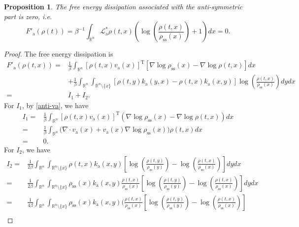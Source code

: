 \documentclass[10pt]{article}
\newtheorem{prop}[thm]{Proposition}
\theoremstyle{definition}
\numberwithin{equation}{section}
\begin{document}
\begin{prop}\label{prop:La}
The free energy dissipation associated with the anti-symmetric part is zero, i.e.
\begin{equation}\label{eq:Fadiss}
    F'_\mathrm{a}(\rho(t)) = \beta^{-1}\int_{\mathbb{R}^n} \mathcal{L}_\mathrm{a}^\ast \rho(t,x) \left(\log \left( \frac{\rho(t,x)}{\rho_\mathrm{ss}(x)} \right) +1 \right) dx = 0.
\end{equation}
\end{prop}
\begin{proof}
The free energy dissipation is 
\begin{align*}
   F'_\mathrm{a}(\rho(t,x))  = & \frac{1}{\beta}\int_{\mathbb{R}^n}[\rho(t,x) v_\mathrm{a}(x)]^\mathrm{T} [\nabla \log\rho_\mathrm{ss}(x) - \nabla \log\rho(t,x)] dx \\
    & +\frac{1}{\beta}\int_{\mathbb{R}^n}\int_{\mathbb{R}^n \setminus \{x\}} [\rho(t,y)k_\mathrm{a}(y,x) - \rho(t,x)k_\mathrm{a}(x,y)]\log \left( \frac{\rho(t,x) }{\rho_\mathrm{ss}(x)} \right) dydx \\
    = & I_1 + I_2. 
\end{align*}
For $I_1$, by \eqref{anti-va}, we have
\begin{align*}
    I_1 
    = & \frac{1}{\beta}\int_{\mathbb{R}^n}[\rho(t,x) v_\mathrm{a}(x)]^\mathrm{T} (\nabla \log\rho_\mathrm{ss}(x) - \nabla \log\rho(t,x)) dx\\
   =& \frac{1}{\beta}\int_{\mathbb{R}^n} \Big(\nabla\cdot v_\mathrm{a}(x) + v_\mathrm{a}(x) \nabla\log \rho_\mathrm{ss}(x)\Big) \rho(t,x) dx\\
    = &  0.
\end{align*}
For $I_2$, we have
\begin{align*}
     I_2= & \frac{1}{2\beta}\int_{\mathbb{R}^n}\int_{\mathbb{R}^n \setminus \{x\}} \rho(t,x)k_\mathrm{a}(x,y) \left[  \log \left( \frac{\rho(t,y) }{\rho_\mathrm{ss}(y)} \right) - \log \left( \frac{\rho(t,x) }{\rho_\mathrm{ss}(x)} \right) \right] dydx \\
     =& \frac{1}{2\beta}\int_{\mathbb{R}^n}\int_{\mathbb{R}^n \setminus \{x\}} \rho_\mathrm{ss}(x)k_\mathrm{a}(x,y) \frac{\rho(t,x)}{\rho_\mathrm{ss}(x)} \left[  \log \left( \frac{\rho(t,y) }{\rho_\mathrm{ss}(y)} \right) - \log \left( \frac{\rho(t,x) }{\rho_\mathrm{ss}(x)} \right) \right] dydx \nonumber\\
     =& \frac{1}{4\beta}\int_{\mathbb{R}^n}\int_{\mathbb{R}^n \setminus \{x\}} \rho_\mathrm{ss}(x)k_\mathrm{a}(x,y) \Bigg(\frac{\rho(t,x)}{\rho_\mathrm{ss}(x)}   \left[  \log \left( \frac{\rho(t,y) }{\rho_\mathrm{ss}(y)} \right) - \log \left( \frac{\rho(t,x) }{\rho_\mathrm{ss}(x)} \right) \right] \\

\end{align*}
\end{proof}
\end{document}
